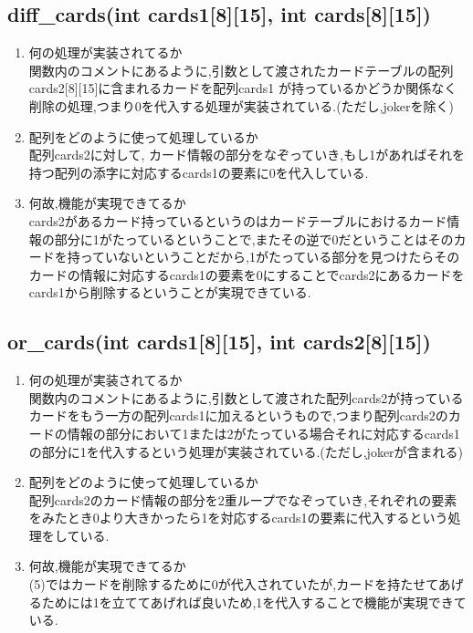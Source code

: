 \documentclass{jsarticle}
\begin{document}
\subsection{diff\_cards(int cards1[8][15], int cards[8][15])}
\begin{enumerate}
  \item  何の処理が実装されてるか\\
  関数内のコメントにあるように,引数として渡されたカードテーブルの配列cards2[8][15]に含まれるカードを配列cards1 が持っているかどうか関係なく削除の処理,つまり0を代入する処理が実装されている.(ただし,jokerを除く)
  \item  配列をどのように使って処理しているか\\
  配列cards2に対して, カード情報の部分をなぞっていき,もし1があればそれを持つ配列の添字に対応するcards1の要素に0を代入している.
  \item  何故,機能が実現できてるか\\
  cards2があるカード持っているというのはカードテーブルにおけるカード情報の部分に1がたっているということで,またその逆で0だということはそのカードを持っていないということだから,1がたっている部分を見つけたらそのカードの情報に対応するcards1の要素を0にすることでcards2にあるカードをcards1から削除するということが実現できている.
\end{enumerate}


\subsection{or\_cards(int cards1[8][15], int cards2[8][15])}
\begin{enumerate}
  \item  何の処理が実装されてるか\\
  関数内のコメントにあるように,引数として渡された配列cards2が持っているカードをもう一方の配列cards1に加えるというもので,つまり配列cards2のカードの情報の部分において1または2がたっている場合それに対応するcards1の部分に1を代入するという処理が実装されている.(ただし,jokerが含まれる)
  \item  配列をどのように使って処理しているか\\
  配列cards2のカード情報の部分を2重ループでなぞっていき,それぞれの要素をみたとき0より大きかったら1を対応するcards1の要素に代入するという処理をしている.
  \item  何故,機能が実現できてるか\\
  (5)ではカードを削除するために0が代入されていたが,カードを持たせてあげるためには1を立ててあげれば良いため,1を代入することで機能が実現できている.
\end{enumerate}
\end{document}
